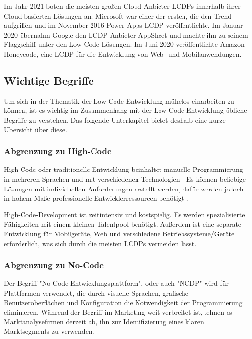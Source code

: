 \documentclass[12pt]{article} %
\begin{document}
	Im Jahr 2021 boten die meisten großen Cloud-Anbieter LCDPs innerhalb ihrer Cloud-basierten Lösungen an. Microsoft war einer der ersten, die den Trend aufgriffen und im November 2016 Power Apps LCDP veröffentlichte. Im Januar 2020 übernahm Google den LCDP-Anbieter AppSheet und machte ihn zu seinem Flaggschiff unter den Low Code Lösungen. Im Juni 2020 veröffentlichte Amazon Honeycode, eine LCDP für die Entwicklung von Web- und Mobilanwendungen. \autocite{DiRuscio.2022}
	
	\subsection{Wichtige Begriffe}
	Um sich in der Thematik der Low Code Entwicklung mühelos einarbeiten zu können, ist es wichtig im Zusammenhang mit der Low Code Entwicklung übliche Begriffe zu verstehen. Das folgende Unterkapitel bietet deshalb eine kurze Übersicht über diese.
	
	\subsubsection{Abgrenzung zu High-Code}
	High-Code oder traditionelle Entwicklung beinhaltet manuelle Programmierung in mehreren Sprachen und mit verschiedenen Technologien \autocite{Mendix.2023}. Es können beliebige Lösungen mit individuellen Anforderungen erstellt werden, dafür werden jedoch in hohem Maße professionelle Entwicklerressourcen benötigt \autocite{Mendix.2023}. \newline
	
	High-Code-Development ist zeitintensiv und kostspielig. Es werden spezialisierte Fähigkeiten mit einem kleinen Talentpool benötigt. Außerdem ist eine separate Entwicklung für Mobilgeräte, Web und verschiedene Betriebssysteme/Geräte erforderlich, was sich durch die meisten LCDPs vermeiden lässt. \autocite{Mendix.2023} 
	
	\subsubsection{Abgrenzung zu No-Code}
	Der Begriff "No-Code-Entwicklungsplattform", oder auch "NCDP" wird für Plattformen verwendet, die durch visuelle Sprachen, grafische Benutzeroberflächen und Konfiguration die Notwendigkeit der Programmierung eliminieren. Während der Begriff im Marketing weit verbreitet ist, lehnen es Marktanalysefirmen derzeit ab, ihn zur Identifizierung eines klaren Marktsegments zu verwenden. \autocite{DiRuscio.2022} \newline
	
\end{document}
